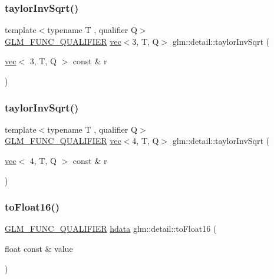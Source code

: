 \subsubsection{\texorpdfstring{taylor\+Inv\+Sqrt()}{taylorInvSqrt()}\hspace{0.1cm}{\footnotesize\ttfamily [3/4]}}
{\footnotesize\ttfamily template$<$typename T , qualifier Q$>$ \\
\mbox{\hyperlink{setup_8hpp_a33fdea6f91c5f834105f7415e2a64407}{G\+L\+M\+\_\+\+F\+U\+N\+C\+\_\+\+Q\+U\+A\+L\+I\+F\+I\+ER}} \mbox{\hyperlink{structglm_1_1vec}{vec}}$<$3, T, Q$>$ glm\+::detail\+::taylor\+Inv\+Sqrt (\begin{DoxyParamCaption}\item[{\mbox{\hyperlink{structglm_1_1vec}{vec}}$<$ 3, T, Q $>$ const \&}]{r }\end{DoxyParamCaption})}

\mbox{\label{namespaceglm_1_1detail_a9547b07e16ac5f72eda78b5bf000fe14}} 
\subsubsection{\texorpdfstring{taylor\+Inv\+Sqrt()}{taylorInvSqrt()}\hspace{0.1cm}{\footnotesize\ttfamily [4/4]}}
{\footnotesize\ttfamily template$<$typename T , qualifier Q$>$ \\
\mbox{\hyperlink{setup_8hpp_a33fdea6f91c5f834105f7415e2a64407}{G\+L\+M\+\_\+\+F\+U\+N\+C\+\_\+\+Q\+U\+A\+L\+I\+F\+I\+ER}} \mbox{\hyperlink{structglm_1_1vec}{vec}}$<$4, T, Q$>$ glm\+::detail\+::taylor\+Inv\+Sqrt (\begin{DoxyParamCaption}\item[{\mbox{\hyperlink{structglm_1_1vec}{vec}}$<$ 4, T, Q $>$ const \&}]{r }\end{DoxyParamCaption})}

\mbox{\label{namespaceglm_1_1detail_ac16321696a34b41c55f941b319d50652}} 
\subsubsection{\texorpdfstring{to\+Float16()}{toFloat16()}}
{\footnotesize\ttfamily \mbox{\hyperlink{setup_8hpp_a33fdea6f91c5f834105f7415e2a64407}{G\+L\+M\+\_\+\+F\+U\+N\+C\+\_\+\+Q\+U\+A\+L\+I\+F\+I\+ER}} \mbox{\hyperlink{namespaceglm_1_1detail_aa2115f7dd38e14fea7ba9e95104120f3}{hdata}} glm\+::detail\+::to\+Float16 (\begin{DoxyParamCaption}\item[{float const \&}]{value }\end{DoxyParamCaption})}

